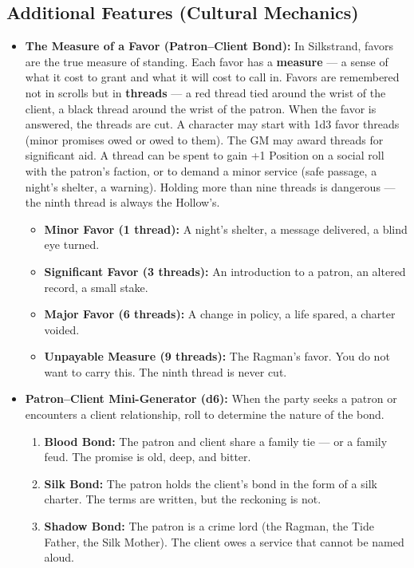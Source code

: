 \subsection*{Additional Features (Cultural Mechanics)}
\label{sec:silkstrand-mechanics}

\begin{itemize}
\item \textbf{The Measure of a Favor (Patron--Client Bond):} In Silkstrand, favors are the true measure of standing. Each favor has a \textbf{measure} --- a sense of what it cost to grant and what it will cost to call in. Favors are remembered not in scrolls but in \textbf{threads} --- a red thread tied around the wrist of the client, a black thread around the wrist of the patron. When the favor is answered, the threads are cut. A character may start with 1d3 favor threads (minor promises owed or owed to them). The GM may award threads for significant aid. A thread can be spent to gain +1 Position on a social roll with the patron's faction, or to demand a minor service (safe passage, a night's shelter, a warning). Holding more than nine threads is dangerous --- the ninth thread is always the Hollow's.
  \begin{itemize}
    \item \textbf{Minor Favor (1 thread):} A night's shelter, a message delivered, a blind eye turned.
    \item \textbf{Significant Favor (3 threads):} An introduction to a patron, an altered record, a small stake.
    \item \textbf{Major Favor (6 threads):} A change in policy, a life spared, a charter voided.
    \item \textbf{Unpayable Measure (9 threads):} The Ragman's favor. You do not want to carry this. The ninth thread is never cut.
  \end{itemize}
\item \textbf{Patron--Client Mini-Generator (d6):} When the party seeks a patron or encounters a client relationship, roll to determine the nature of the bond.
  \begin{enumerate}
    \item \textbf{Blood Bond:} The patron and client share a family tie --- or a family feud. The promise is old, deep, and bitter.
    \item \textbf{Silk Bond:} The patron holds the client's bond in the form of a silk charter. The terms are written, but the reckoning is not.
    \item \textbf{Shadow Bond:} The patron is a crime lord (the Ragman, the Tide Father, the Silk Mother). The client owes a service that cannot be named aloud.

\end{enumerate}
\end{itemize}
